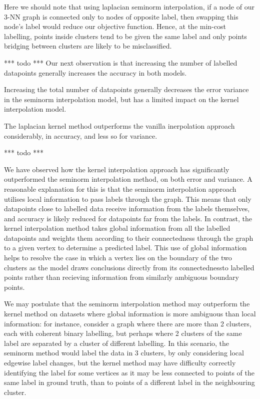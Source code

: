 \documentclass[12pt]{article}
\begin{document}
Here we should note that using laplacian seminorm interpolation, if a node of our 3-NN graph is connected only to nodes of opposite label, then swapping this node's label would reduce
our objective function. Hence, at the min-cost labelling, points inside clusters tend to be given the same label and only points bridging between clusters are likely to be misclassified.

*** todo ***
Our next observation is that increasing the number of labelled datapoints generally increases the accuracy in both models.

Increasing the total number of datapoints generally decreases the error variance in the seminorm interpolation
model, but has a limited impact on the kernel interpolation model. 

The laplacian kernel method outperforms the vanilla inerpolation approach considerably, in accuracy, and less so
for variance. 

*** todo *** 

We have observed how the kernel interpolation approach has significantly outperformed the seminorm interpolation method, on both error and variance.
 A reasonable explanation for this is that the seminorm interpolation approach utilises local information to pass labels through the graph. This means that only datapoints close to labelled data receive information from the labels themselves, and accuracy is likely reduced for datapoints far from the labels. In contrast, the kernel interpolation method takes global information from all the labelled datapoints and weights them according to their connectedness through the graph to a given vertex to determine a predicted label. This use of global information helps to resolve the case in which a vertex lies on the boundary of the two clusters as the model draws conclusions directly from its connectednessto labelled points rather than recieving information from similarly ambiguous boundary points.

We may postulate that the seminorm interpolation method may outperform the kernel method on datasets where global information is more ambiguous than local information: for instance, consider a graph where there are more than 2 clusters, each with coherent binary labelling, but perhaps where 2 clusters of the same label are separated by a cluster of different labelling. In this scenario, the seminorm method would label the data in 3 clusters, by only considering local edgewise label changes, but the kernel method may have difficulty correctly identifying the label for some vertices as it may be less connected to points of the same label in ground truth, than to points of a different label in the neighbouring cluster. 
\end{document}
